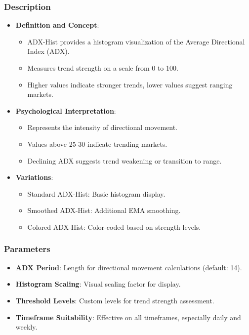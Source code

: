 \documentclass[12pt]{article}
\begin{document}
\subsubsection{Description}
\begin{itemize}
\item \textbf{Definition and Concept}:
  \begin{itemize}
  \item ADX-Hist provides a histogram visualization of the Average Directional Index (ADX).
  \item Measures trend strength on a scale from 0 to 100.
  \item Higher values indicate stronger trends, lower values suggest ranging markets.
  \end{itemize}
\item \textbf{Psychological Interpretation}:
  \begin{itemize}
  \item Represents the intensity of directional movement.
  \item Values above 25-30 indicate trending markets.
  \item Declining ADX suggests trend weakening or transition to range.
  \end{itemize}
\item \textbf{Variations}:
  \begin{itemize}
  \item Standard ADX-Hist: Basic histogram display.
  \item Smoothed ADX-Hist: Additional EMA smoothing.
  \item Colored ADX-Hist: Color-coded based on strength levels.
  \end{itemize}
\end{itemize}

\subsubsection{Parameters}
\begin{itemize}
\item \textbf{ADX Period}: Length for directional movement calculations (default: 14).
\item \textbf{Histogram Scaling}: Visual scaling factor for display.
\item \textbf{Threshold Levels}: Custom levels for trend strength assessment.
\item \textbf{Timeframe Suitability}: Effective on all timeframes, especially daily and weekly.
\end{itemize}
\end{document}
